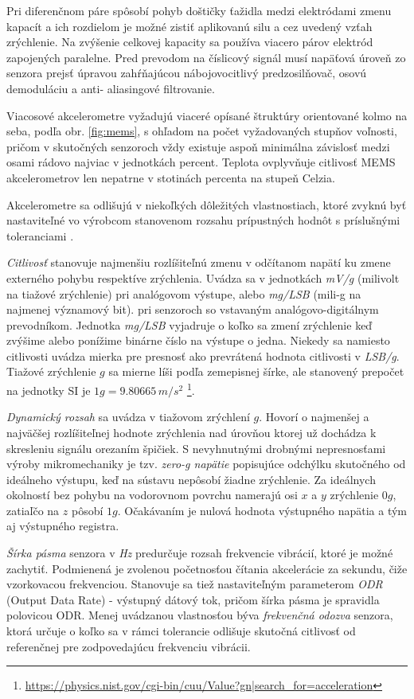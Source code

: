 Pri diferenčnom páre spôsobí pohyb doštičky ťažidla medzi elektródami zmenu kapacít a ich rozdielom je možné zistiť aplikovanú silu a
cez uvedený vzťah zrýchlenie. Na zvýšenie celkovej kapacity sa používa viacero párov elektród zapojených paralelne. Pred prevodom na
číslicový signál musí napäťová úroveň zo senzora prejsť úpravou zahŕňajúcou nábojovocitlivý predzosilňovač, osovú demoduláciu a anti-
aliasingové filtrovanie. 

Viacosové akcelerometre vyžadujú viaceré opísané štruktúry orientované kolmo na seba, podľa obr. \ref{fig:mems}, s ohľadom na počet 
vyžadovaných stupňov voľnosti, pričom v skutočných senzoroch vždy existuje aspoň minimálna závislosť medzi osami rádovo najviac v 
jednotkách percent. Teplota ovplyvňuje citlivosť MEMS akcelerometrov len nepatrne v stotinách percenta na stupeň Celzia.

Akcelerometre sa odlišujú v niekoľkých dôležitých vlastnostiach, ktoré zvyknú byť nastaviteľné vo výrobcom stanovenom rozsahu
prípustných hodnôt s príslušnými toleranciami \cite{accelerometer-mechanics}.

\emph{Citlivosť} stanovuje najmenšiu rozlíšiteľnú zmenu v odčítanom napätí ku zmene externého pohybu respektíve zrýchlenia.
Uvádza sa v jednotkách \emph{mV/g} (milivolt na tiažové zrýchlenie) pri analógovom výstupe, alebo \emph{mg/LSB} (mili-g
na najmenej významový bit). pri senzoroch so vstavaným analógovo-digitálnym prevodníkom. Jednotka \emph{mg/LSB} vyjadruje
o koľko sa zmení zrýchlenie keď zvýšime alebo ponížime binárne číslo na výstupe o jedna. Niekedy sa namiesto
citlivosti uvádza mierka pre presnosť ako prevrátená hodnota citlivosti v \emph{LSB/g}. Tiažové zrýchlenie $g$ sa mierne líši podľa
zemepisnej šírke, ale stanovený prepočet na jednotky SI je $1 g = 9.80665\,m/s^2$
\footnote{\url{https://physics.nist.gov/cgi-bin/cuu/Value?gn|search_for=acceleration}}.

\emph{Dynamický rozsah} sa uvádza v tiažovom  zrýchlení $g$. Hovorí o najmenšej a najväčšej rozlíšiteľnej hodnote zrýchlenia nad
úrovňou ktorej už dochádza k skresleniu signálu orezaním špičiek. S nevyhnutnými drobnými nepresnosťami výroby mikromechaniky je tzv.
\emph{zero-g napätie} popisujúce odchýlku skutočného od ideálneho výstupu, keď na sústavu nepôsobí žiadne zrýchlenie. Za ideálnych
okolností bez pohybu na vodorovnom povrchu namerajú osi $x$ a $y$ zrýchlenie $0g$, zatiaľčo na $z$ pôsobí $1g$. Očakávaním je nulová
hodnota výstupného napätia a tým aj výstupného registra.

\emph{Šírka pásma} senzora v \emph{Hz} predurčuje rozsah frekvencie vibrácií, ktoré je možné zachytiť. Podmienená je zvolenou
početnosťou  čítania akcelerácie za sekundu, čiže vzorkovacou frekvenciou. Stanovuje sa tiež nastaviteľným parameterom \emph{ODR}
(Output Data Rate) - výstupný dátový tok, pričom šírka pásma je spravidla polovicou ODR. Menej uvádzanou vlastnosťou býva 
\emph{frekvenčná odozva} senzora, ktorá určuje o koľko sa v rámci tolerancie odlišuje skutočná 
citlivosť od referenčnej pre zodpovedajúcu frekvenciu vibrácii. 

